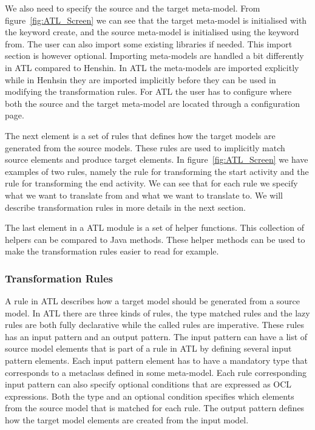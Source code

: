 We also need to specify the source and the target meta-model. From
figure~\ref{fig:ATL_Screen} we can see that the target meta-model is initialised 
with the keyword create, and the source meta-model is initialised using the
keyword from. The user can also import some existing libraries if needed. This
import section is however optional. Importing meta-models are handled a bit
differently in ATL compared to Henshin. In ATL the meta-models are imported
explicitly while in Henhsin they are imported implicitly before they can be used
in modifying the transformation rules. For ATL the user has to configure where
both the source and the target meta-model are located through a configuration
page. 

The next element is a set of rules that defines how the target models are
generated from the source models. These rules are used to implicitly match
source elements and produce target elements. In figure~\ref{fig:ATL_Screen} we
have examples of two rules, namely the rule for transforming the start activity
and the rule for transforming the end activity. We can see that for each rule we
specify what we want to translate from and what we want to translate to. We will
describe transformation rules in more details in the next section.

The last element in a ATL module is a set of helper functions. This collection
of helpers can be compared to Java methods. These helper methods can be used to
make the transformation rules easier to read for example.

\subsubsection*{Transformation Rules}

A rule in ATL describes how a target model should be generated from a source
model. In ATL there are three kinds of rules, the type matched rules and the
lazy rules are both fully declarative while the called rules are imperative.
These rules has an input pattern and an output pattern. The input pattern can
have a list of source model elements that is part of a rule in ATL by defining
several input pattern elements. Each input pattern element has to have a
mandatory type that corresponds to a metaclass defined in some meta-model. Each
rule corresponding input pattern can also specify optional conditions that are
expressed as OCL expressions. Both the type and an optional condition specifies
which elements from the source model that is matched for each rule. The output
pattern defines how the target model elements are created from the input model. 


